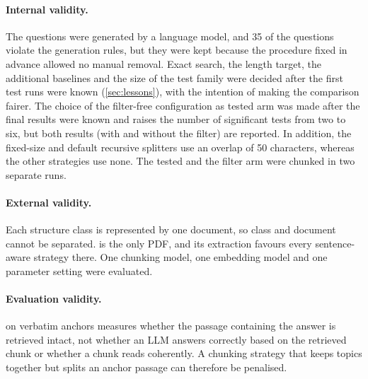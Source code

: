 \paragraph{Internal validity.} The questions were generated by a language model, and 35 of
the  questions violate the generation rules, but they were kept because the
procedure fixed in advance allowed no manual removal. Exact search, the length target, the
additional baselines and the size of the test family were decided after the first test
runs were known (\cref{sec:lessons}), with the intention of making the comparison fairer.
The choice of the filter-free configuration as tested arm was made after the final results
were known and raises the number of significant tests from two to six, but both results
(with and without the filter) are reported. In addition, the fixed-size and default
recursive splitters use an overlap of 50 characters, whereas the other strategies use
none. The tested and the filter arm were chunked in two separate runs.

\paragraph{External validity.} Each structure class is represented by one document, so
class and document cannot be separated.  is the only PDF, and its extraction
favours every sentence-aware strategy there. One chunking model, one embedding model and
one parameter setting were evaluated.

\paragraph{Evaluation validity.}  on verbatim anchors measures whether the
passage containing the answer is retrieved intact, not whether an LLM answers correctly
based on the retrieved chunk or whether a chunk reads coherently. A chunking strategy that
keeps topics together but splits an anchor passage can therefore be penalised.
